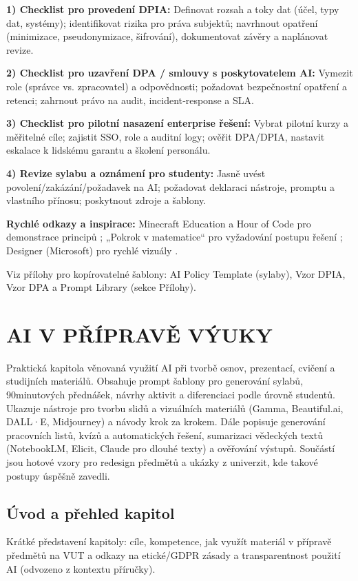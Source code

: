 \documentclass{report}%
\begin{document}
\textbf{1) Checklist pro provedení DPIA:} Definovat rozsah a toky dat (účel, typy dat, systémy); identifikovat rizika pro práva subjektů; navrhnout opatření (minimizace, pseudonymizace, šifrování), dokumentovat závěry a naplánovat revize.

\medskip

\textbf{2) Checklist pro uzavření DPA / smlouvy s poskytovatelem AI:} Vymezit role (správce vs. zpracovatel) a odpovědnosti; požadovat bezpečnostní opatření a retenci; zahrnout právo na audit, incident‑response a SLA.

\medskip

\textbf{3) Checklist pro pilotní nasazení enterprise řešení:} Vybrat pilotní kurzy a měřitelné cíle; zajistit SSO, role a auditní logy; ověřit DPA/DPIA, nastavit eskalace k lidskému garantu a školení personálu.

\medskip

\textbf{4) Revize sylabu a oznámení pro studenty:} Jasně uvést povolení/zakázání/požadavek na AI; požadovat deklaraci nástroje, promptu a vlastního přínosu; poskytnout zdroje a šablony.

\medskip

\textbf{Rychlé odkazy a inspirace:} Minecraft Education a Hour of Code pro demonstrace principů \cite{kb_ai_101_tipu_pdf_04e4a115_page_15_2}; „Pokrok v matematice“ pro vyžadování postupu řešení \cite{kb_ai_101_tipu_pdf_04e4a115_page_8_1}; Designer (Microsoft) pro rychlé vizuály \cite{kb_ai_101_tipu_pdf_04e4a115_page_51_1}.

Viz přílohy pro kopírovatelné šablony: AI Policy Template (sylaby), Vzor DPIA, Vzor DPA a Prompt Library (sekce Přílohy).%

%
\chapter{AI V PŘÍPRAVĚ VÝUKY}%
Praktická kapitola věnovaná využití AI při tvorbě osnov, prezentací, cvičení a studijních materiálů. Obsahuje prompt šablony pro generování sylabů, 90minutových přednášek, návrhy aktivit a diferenciaci podle úrovně studentů. Ukazuje nástroje pro tvorbu slidů a vizuálních materiálů (Gamma, Beautiful.ai, DALL·E, Midjourney) a návody krok za krokem. Dále popisuje generování pracovních listů, kvízů a automatických řešení, sumarizaci vědeckých textů (NotebookLM, Elicit, Claude pro dlouhé texty) a ověřování výstupů. Součástí jsou hotové vzory pro redesign předmětů a ukázky z univerzit, kde takové postupy úspěšně zavedli.%
\section{Úvod a přehled kapitol}%
Krátké představení kapitoly: cíle, kompetence, jak využít materiál v přípravě předmětů na VUT a odkazy na etické/GDPR zásady a transparentnost použití AI (odvozeno z kontextu příručky).%
\end{document}
